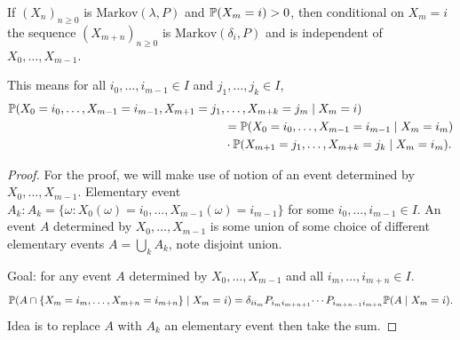 \documentclass[10pt, a4paper]{article}
\begin{document}
\begin{theorem}
    If $(X_n)_{n \geq 0}$ is $\mathrm{Markov}(\lambda, P)$ and $\P(X_m = i) > 0$,
    then conditional on $X_m = i$ the sequence $(X_{m + n})_{n \geq 0}$ is $\mathrm{Markov}(\delta_i, P)$ and is independent of $X_0, \dotsc, X_{m - 1}$.

    This means for all $i_0, \dotsc, i_{m - 1} \in I$ and $j_1, \dotsc, j_k \in I$,
    \begin{align*}
        \P(X_0 = i_0, \dotsc, X_{m - 1} = i_{m - 1}, X_{m + 1} = j_1,&\dotsc, X_{m + k} = j_m \mid X_m = i) \\
        &= \P(X_0 = i_0, \dotsc, X_{m - 1} = i_{m - 1} \mid X_m = i_m) \\
        &\cdot \P(X_{m + 1} = j_1, \dotsc, X_{m + k} = j_k \mid X_m = i_m).
    \end{align*}

    \begin{proof}
        For the proof,
        we will make use of notion of an event determined by $X_0, \dotsc, X_{m - 1}$.
        Elementary event $A_k : A_k = \{\omega : X_0(\omega) = i_0, \dotsc, X_{m - 1}(\omega) = i_{m - 1}\}$ for some $i_0, \dotsc, i_{m - 1} \in I$.
        An event $A$ determined by $X_0, \dotsc, X_{m - 1}$ is some union of some choice of different elementary events $A = \bigcup_{k}A_k$,
        note disjoint union.

        Goal:
        for any event $A$ determined by $X_0, \dotsc, X_{m - 1}$ and all $i_m, \dotsc, i_{m + n} \in I$.
        \[
        \P(A \cap \{X_m = i_m, \dotsc, X_{m + n} = i_{m + n}\} \mid X_m = i) = \delta_{ii_m}P_{i_{m}i_{m + n + 1}}\dotsi P_{i_{m + n - 1}i_{m + n}}\P(A \mid X_m = i).
        \]
        Idea is to replace $A$ with $A_k$ an elementary event then take the sum.


\end{proof}
\end{theorem}
\end{document}
